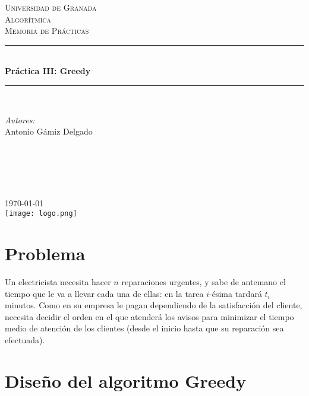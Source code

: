 \documentclass[11pt]{article}
\begin{document}
\begin{titlepage}
\newcommand{\HRule}{\rule{\linewidth}{0.5mm}}
\center
\textsc{\LARGE Universidad de Granada}\\[1.5cm] %
\textsc{\Large Algorítmica}\\[0.5cm] %
\textsc{\large Memoria de Prácticas}\\[0.5cm] %
\HRule \\[0.4cm]
{ \huge \bfseries Práctica III: Greedy}\\[0.4cm] %
\HRule \\[1.5cm]
\begin{minipage}{0.4\textwidth}
\begin{flushleft} \large
\emph{Autores:}\\
Antonio Gámiz Delgado\textsc{} %
\end{flushleft}
\end{minipage}
~
\begin{minipage}{0.4\textwidth}
\begin{flushright} \large
\emph{} \\
\textsc{} %
\end{flushright}
\end{minipage}\\[2cm]
{\large \today}\\[2cm] %
\texttt{[image: logo.png]}\\[1cm]
\vfill %
\end{titlepage}

\section{Problema}

Un electricista necesita hacer $n$ reparaciones urgentes, y sabe de antemano el tiempo que le va a llevar cada una de ellas: en la tarea $i$-ésima tardará $t_i$ minutos. Como en su empresa le pagan dependiendo de la satisfacción del cliente, necesita decidir el orden en el que atenderá los avisos para minimizar el tiempo medio de atención de los clientes (desde el inicio hasta que su reparación sea efectuada).

\section{Diseño del algoritmo Greedy}
\end{document}

